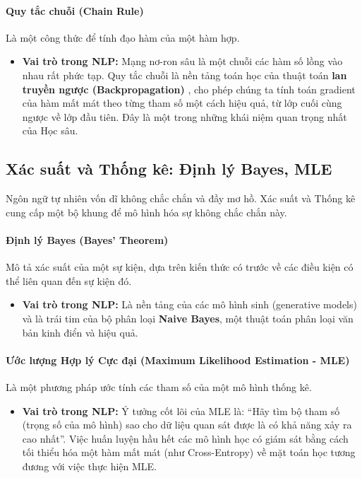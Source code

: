 \paragraph{Quy tắc chuỗi (Chain Rule)}
Là một công thức để tính đạo hàm của một hàm hợp.
\begin{itemize}
    \item \textbf{Vai trò trong NLP:} Mạng nơ-ron sâu là một chuỗi các hàm số lồng vào nhau rất phức tạp. Quy tắc chuỗi là nền tảng toán học của thuật toán \textbf{lan truyền ngược (Backpropagation)} \cite{rumelhart1986learning}, cho phép chúng ta tính toán gradient của hàm mất mát theo từng tham số một cách hiệu quả, từ lớp cuối cùng ngược về lớp đầu tiên. Đây là một trong những khái niệm quan trọng nhất của Học sâu.
\end{itemize}

\subsection{Xác suất và Thống kê: Định lý Bayes, MLE}
\label{ssec:xac_suat_thong_ke}
Ngôn ngữ tự nhiên vốn dĩ không chắc chắn và đầy mơ hồ. Xác suất và Thống kê cung cấp một bộ khung để mô hình hóa sự không chắc chắn này.

\paragraph{Định lý Bayes (Bayes' Theorem)}
Mô tả xác suất của một sự kiện, dựa trên kiến thức có trước về các điều kiện có thể liên quan đến sự kiện đó.
\begin{itemize}
    \item \textbf{Vai trò trong NLP:} Là nền tảng của các mô hình sinh (generative models) và là trái tim của bộ phân loại \textbf{Naive Bayes}, một thuật toán phân loại văn bản kinh điển và hiệu quả.
\end{itemize}

\paragraph{Ước lượng Hợp lý Cực đại (Maximum Likelihood Estimation - MLE)}
Là một phương pháp ước tính các tham số của một mô hình thống kê.
\begin{itemize}
    \item \textbf{Vai trò trong NLP:} Ý tưởng cốt lõi của MLE là: “Hãy tìm bộ tham số (trọng số của mô hình) sao cho dữ liệu quan sát được là có khả năng xảy ra cao nhất”. Việc huấn luyện hầu hết các mô hình học có giám sát bằng cách tối thiểu hóa một hàm mất mát (như Cross-Entropy) về mặt toán học tương đương với việc thực hiện MLE.
\end{itemize}

